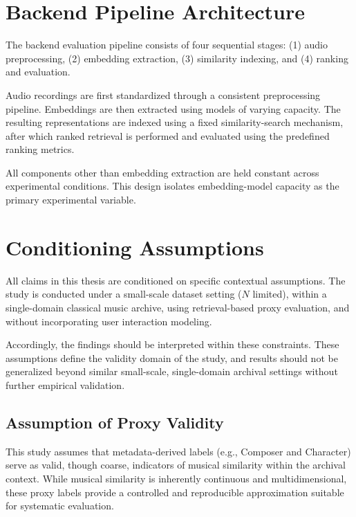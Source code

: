 \section{Backend Pipeline Architecture}

The backend evaluation pipeline consists of four sequential stages: 
(1) audio preprocessing, 
(2) embedding extraction, 
(3) similarity indexing, and 
(4) ranking and evaluation.

Audio recordings are first standardized through a consistent preprocessing pipeline.
Embeddings are then extracted using models of varying capacity.
The resulting representations are indexed using a fixed similarity-search mechanism, after which ranked retrieval is performed and evaluated using the predefined ranking metrics.

All components other than embedding extraction are held constant across experimental conditions.
This design isolates embedding-model capacity as the primary experimental variable.


\section{Conditioning Assumptions}

All claims in this thesis are conditioned on specific contextual assumptions. 
The study is conducted under a small-scale dataset setting ($N$ limited), 
within a single-domain classical music archive, 
using retrieval-based proxy evaluation, 
and without incorporating user interaction modeling.

Accordingly, the findings should be interpreted within these constraints. 
These assumptions define the validity domain of the study, 
and results should not be generalized beyond similar small-scale, 
single-domain archival settings without further empirical validation.

\subsection*{Assumption of Proxy Validity}

This study assumes that metadata-derived labels (e.g., Composer and Character) 
serve as valid, though coarse, indicators of musical similarity within the archival context. 
While musical similarity is inherently continuous and multidimensional, 
these proxy labels provide a controlled and reproducible approximation suitable for systematic evaluation.



